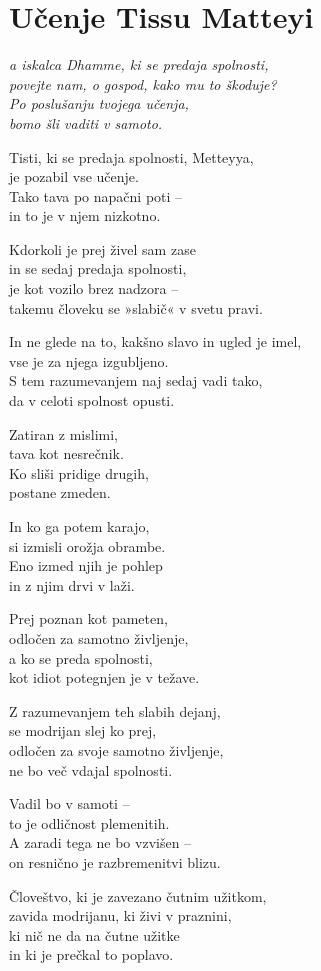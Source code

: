\cleartorecto
{}
\chapter{Učenje Tissu Matteyi}

\emph{a iskalca Dhamme, ki se predaja spolnosti,\\
povejte nam, o gospod, kako mu to škoduje?\\
Po poslušanju tvojega učenja,\\
bomo šli vaditi v samoto.}

Tisti, ki se predaja spolnosti, Metteyya,\\
je pozabil vse učenje.\\
Tako tava po napačni poti --\\
in to je v njem nizkotno.

\clearpage

Kdorkoli je prej živel sam zase\\
in se sedaj predaja spolnosti,\\
je kot vozilo brez nadzora --\\
takemu človeku se »slabič« v svetu pravi.

In ne glede na to, kakšno slavo in ugled je imel,\\
vse je za njega izgubljeno.\\
S tem razumevanjem naj sedaj vadi tako,\\
da v celoti spolnost opusti.

Zatiran z mislimi,\\
tava kot nesrečnik.\\
Ko sliši pridige drugih,\\
postane zmeden.

In ko ga potem karajo,\\
si izmisli orožja obrambe.\\
Eno izmed njih je pohlep\\
in z njim drvi v laži.

Prej poznan kot pameten,\\
odločen za samotno življenje,\\
a ko se preda spolnosti,\\
kot idiot potegnjen je v težave.

Z razumevanjem teh slabih dejanj,\\
se modrijan slej ko prej,\\
odločen za svoje samotno življenje,\\
ne bo več vdajal spolnosti.

Vadil bo v samoti --\\
to je odličnost plemenitih.\\
A zaradi tega ne bo vzvišen --\\
on resnično je razbremenitvi blizu.

Človeštvo, ki je zavezano čutnim užitkom,\\
zavida modrijanu, ki živi v praznini,\\
ki nič ne da na čutne užitke\\
in ki je prečkal to poplavo.

